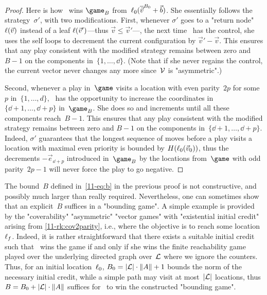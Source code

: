 \begin{proof}
  Here is how \Eve\ wins $\game_B$ from~$\loc_0(\capp[B_0]v+\vec b)$.
  She essentially follows the strategy~$\sigma'$, with two
  modifications.  First, whenever $\sigma'$ goes to a "return node"
  $\loc(\vec v)$ instead of a leaf $\loc(\vec v')$---thus $\vec
  v\leq\vec v'$---, the next time \Eve\ has the control, she uses the
  self loops to decrement the current configuration by $\vec v'-\vec
  v$.  This ensures that any play consistent with the modified
  strategy remains between zero and $B-1$ on the components
  in~$\{1,\dots,\dd\}$.  (Note that if she never regains the control,
  the current vector never changes any more since~$\?V$ is
  "asymmetric".)

  Second, whenever a play in~$\game$ visits a location with even
  parity~$2p$ for some~$p$ in~$\{1,\dots,d\}$, \Eve\ has the opportunity
  to increase the coordinates in~$\{\dd+1,\dots,\dd+p\}$ in~$\game_B$.
  She does so and increments until all these components reach~$B-1$.
  This ensures that any play consistent with the modified strategy
  remains between zero and $B-1$ on the components
  in~$\{\dd+1,\dots,\dd+p\}$.  Indeed, $\sigma'$ guarantees that the
  longest sequence of moves before a play visits a location with
  maximal even priority is bounded by $H(\loc_0(\vec v_0))$, thus the
  decrements $-\vec e_{\dd+p}$ introduced in~$\game_B$ by the
  locations from~$\game$ with odd parity~$2p-1$ will never force the
  play to go negative.
\end{proof}

The bound~$B$ defined in~\cref{11-eq:b} in the previous proof is not
constructive, and possibly much larger than really required.
Nevertheless, one can sometimes show that an explicit~$B$ suffices in
a "bounding game".
A simple example is provided by the "coverability" "asymmetric"
"vector games" with "existential initial credit" arising from
\cref{11-rk:cov2parity}, i.e., where the objective is to reach some
location~$\loc_f$.  Indeed, it is rather straightforward that there
exists a suitable initial credit such that \Eve\ wins the game if and
only if she wins the finite reachability game played over the
underlying directed graph over~$\Loc$ where we ignore the counters.
Thus, for an initial location~$\loc_0$, $B_0=|\Loc|\cdot\|\Act\|+1$
bounds the norm of the necessary initial credit, while a simple path
may visit at most~$|\Loc|$ locations, thus
$B=B_0+|\Loc|\cdot\|\Act\|$ suffices for \Eve\ to win the constructed
"bounding game".

